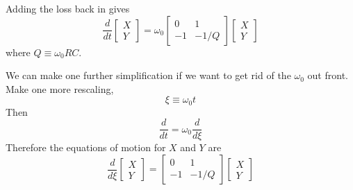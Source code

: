 \documentclass{article}
\begin{document}
Adding the loss back in gives \begin{displaymath}
\frac{d}{dt} \left[ \begin{array}{c} X \\ Y \end{array} \right] =
\omega_0 \left[ \begin{array}{cc} 0 & 1 \\ -1 & -1/Q \end{array} \right]
\left[ \begin{array}{c} X \\ Y \end{array} \right] \end{displaymath}
where $Q\equiv \omega_0 R C$.

We can make one further simplification if we want to get rid of the $\omega_0$ out front.
Make one more rescaling,\begin{equation}
\xi\equiv\omega_{0}t \end{equation}
Then \begin{equation}
\frac{d}{dt}=\omega_{0}\frac{d}{d\xi}\end{equation}
Therefore the equations of motion for $X$ and $Y$ are \begin{equation}
\frac{d}{d\xi}\left[\begin{array}{c} X\\ Y\end{array}\right] = 
\left[\begin{array}{cc} 0 & 1\\ -1 & -1/Q \end{array}\right]
\left[\begin{array}{c} X\\ Y\end{array}\right]\end{equation}
\end{document}
